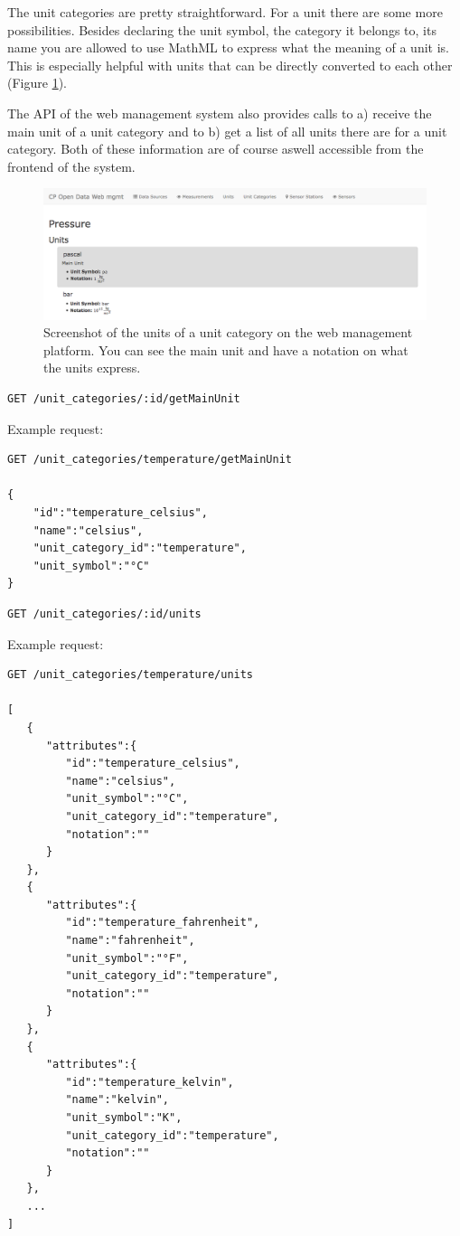 The unit categories are pretty straightforward. For a unit there are
some more possibilities. Besides declaring the unit symbol, the category
it belongs to, its name you are allowed to use MathML to express what
the meaning of a unit is. This is especially helpful with units that can
be directly converted to each other (Figure \ref{fig:screen-units}).

The API of the web management system also provides calls to a) receive
the main unit of a unit category and to b) get a list of all units there
are for a unit category. Both of these information are of course aswell
accessible from the frontend of the system.

\begin{figure}[b]
	\includegraphics[width=1.00\textwidth]{images/unit_frontend.png}
	\caption{Screenshot of the units of a unit category on the web management platform. You can see the main unit and have a notation on what the units express.}
	\label{fig:screen-units}
\end{figure}

\begin{verbatim}
GET /unit_categories/:id/getMainUnit
\end{verbatim}

Example request:

\begin{verbatim}
GET /unit_categories/temperature/getMainUnit

{
    "id":"temperature_celsius",
    "name":"celsius",
    "unit_category_id":"temperature",
    "unit_symbol":"°C"
}
\end{verbatim}

\begin{verbatim}
GET /unit_categories/:id/units
\end{verbatim}

Example request:

\begin{verbatim}
GET /unit_categories/temperature/units

[
   {
      "attributes":{
         "id":"temperature_celsius",
         "name":"celsius",
         "unit_symbol":"°C",
         "unit_category_id":"temperature",
         "notation":""
      }
   },
   {
      "attributes":{
         "id":"temperature_fahrenheit",
         "name":"fahrenheit",
         "unit_symbol":"°F",
         "unit_category_id":"temperature",
         "notation":""
      }
   },
   {
      "attributes":{
         "id":"temperature_kelvin",
         "name":"kelvin",
         "unit_symbol":"K",
         "unit_category_id":"temperature",
         "notation":""
      }
   },
   ...
]
\end{verbatim}

